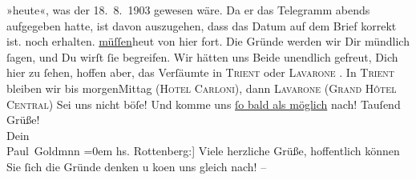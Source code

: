 \begin{ledgroupsized}[t]{13cm}
{{{                     »heute«, was der 18. 8. 1903
                  gewesen wäre. Da er das Telegramm abends aufgegeben hatte, ist davon
                  auszugehen, dass das Datum auf dem Brief korrekt ist.}}}\label{K_L03384-1h} noch erhalten.
                  \label{K_L03384-2v}\label{K_L03384-2h}{ }\uline{müſſen}heut von hier fort. \strikeout{\textcolor{gray}{S}} Die Gründe werden wir Dir mündlich ſagen, und Du wirſt ſie begreifen. Wir
               hätten uns Beide unendlich gefreut, Dich hier zu ſehen, hoffen aber, das Verſäumte in
                  \textsc{Trient}{ } oder \textsc{Lavarone}{ }\label{K_L03384-3v}\label{K_L03384-3h}. In \textsc{Trient} bleiben  wir bis morgenMittag (\textsc{Hotel Carloni}), dann \textsc{Lavarone} (\textsc{Grand Hôtel Central})\pend
           \pstart
           {\pb}Sei uns nicht böſe! Und komme uns \uline{ſo bald als möglich} nach!\pend
           \pstart
           Tauſend Grüße! {\\[\baselineskip]}Dein {\\[\baselineskip]}\spacefill\mbox{Paul Goldmnn}\pend
           \leftskip=0em{}\pstart
           \noindent{}{[}hs. Rottenberg:{]} Viele herzliche Grüße, hoffentlich können Sie ſich
                  die Gründe denken u ko{\geminationm}en uns gleich nach! –\pend
           
         
         \endnumbering{}\end{ledgroupsized}\begin{anhang}\end{anhang}\newcommand{\dateiname}{L03384}\newcommand{\titel}{Paul Goldmann und Theodore Rottenberg an Arthur Schnitzler, 18. 8. [1903]}\newcommand{\editorInnen}{Martin Anton Müller und Laura Untner}
      